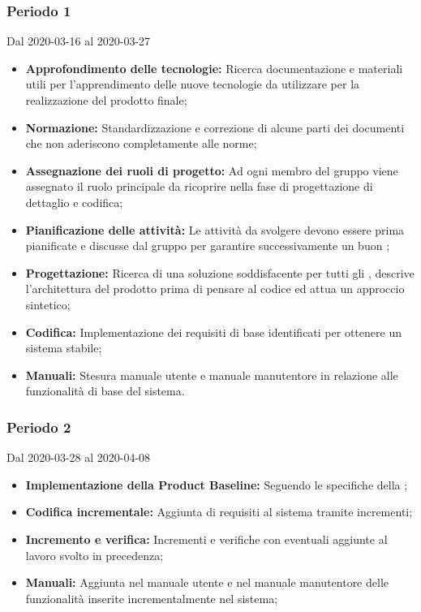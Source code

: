 \subsubsection{Periodo 1} 
Dal 2020-03-16 al 2020-03-27\\
\begin{itemize}
	\item \textbf{Approfondimento delle tecnologie:} Ricerca documentazione e materiali utili per l'apprendimento delle nuove tecnologie da utilizzare per la realizzazione del prodotto finale;
	\item \textbf{Normazione:} Standardizzazione e correzione di alcune parti dei documenti che non aderiscono completamente alle norme;
	\item \textbf{Assegnazione dei ruoli di progetto:} Ad ogni membro del gruppo viene assegnato il ruolo principale da ricoprire nella fase di progettazione di dettaglio e codifica;
	\item \textbf{Pianificazione delle attività:} Le attività da svolgere devono essere prima pianificate e discusse dal gruppo per garantire successivamente un buon ;
	\item \textbf{Progettazione:} Ricerca di una soluzione soddisfacente per tutti gli , descrive l'architettura del prodotto prima di pensare al codice ed attua un approccio sintetico;
	\item \textbf{Codifica:} Implementazione dei requisiti di base identificati per ottenere un sistema stabile;
	\item \textbf{Manuali:} Stesura manuale utente e manuale manutentore in relazione alle funzionalità di base del sistema.
\end{itemize}
\subsubsection{Periodo 2} 
Dal 2020-03-28 al 2020-04-08\\
\begin{itemize}
	\item \textbf{Implementazione della Product Baseline:} Seguendo le specifiche della ;
	\item \textbf{Codifica incrementale:} Aggiunta di requisiti al sistema tramite incrementi;
	\item \textbf{Incremento e verifica:} Incrementi e verifiche con eventuali aggiunte al lavoro svolto in precedenza;
	\item \textbf{Manuali:} Aggiunta nel manuale utente e nel manuale manutentore delle funzionalità inserite incrementalmente nel sistema;
\end{itemize}
